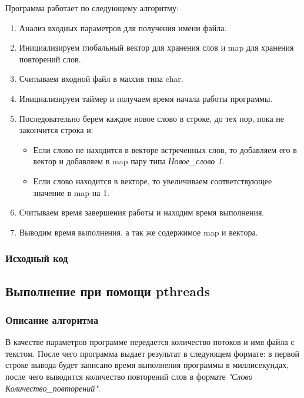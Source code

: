 \documentclass[12pt,a4paper]{report}
\begin{document}
				Программа работает по следующему алгоритму:
				\begin{enumerate}
					\item Анализ входных параметров для получения имени файла.
					\item Инициализируем глобальный вектор для хранения слов и map для хранения повторений слов.
					\item Считываем входной файл в массив типа char.
					\item Инициализируем таймер и получаем время начала работы программы.
					\item Последовательно берем каждое новое слово в строке, до тех пор, пока не закончится строка и:
						\begin{itemize}
							\item Если слово не находится в векторе встреченных слов, то добавляем его в вектор и добавляем в map пару типа \textit{Новое\_слово 1}.
							\item Если слово находится в векторе, то увеличиваем соответствующее значение в map на 1.
						\end{itemize}
					\item Считываем время завершения работы и находим время выполнения.
					\item Выводим время выполнения, а так же содержимое map и вектора.
				\end{enumerate}
			\subsubsection{Исходный код}
			
			\subsection{Выполнение при помощи pthreads}
				\subsubsection{Описание алгоритма}
					В качестве параметров программе передается количество потоков и имя файла с текстом. После чего программа выдает результат в следующем формате: в первой строке вывода будет записано время выполнения программы в миллисекундах, после чего выводится количество повторений слов в формате \textit{"Слово Количество\_повторений"}.
					
\end{document}
